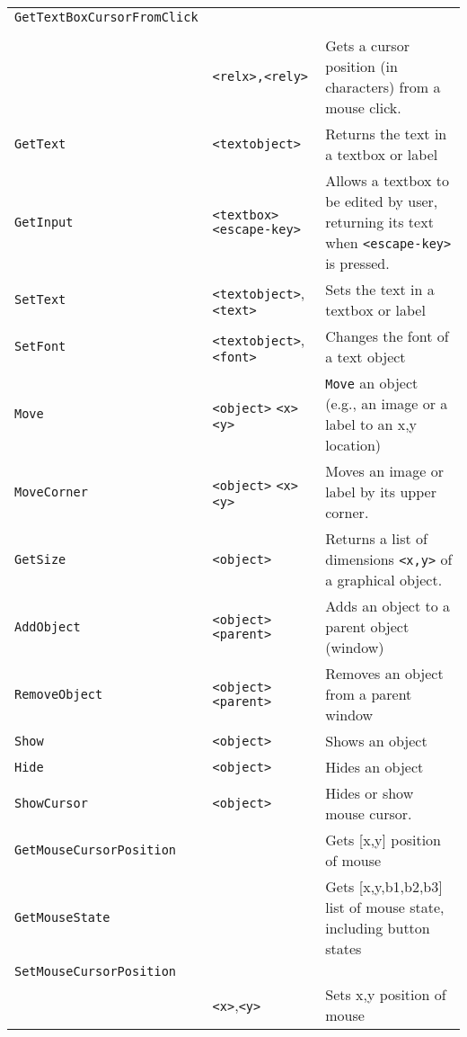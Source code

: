 \begin{longtable}{p{3cm}p{3cm}p{6cm}}
\verb+GetTextBoxCursorFromClick+&\\
\\ & \verb+<relx>,<rely>+ & Gets a cursor position (in characters) from a mouse click.\\
\verb+GetText+ &\verb+<textobject>+ &Returns the text in a textbox or label\\ 
\verb+GetInput+ &\verb+<textbox>+ \verb+<escape-key>+& Allows a textbox to be edited by user, returning its text when \verb+<escape-key>+ is pressed.\\ 
\verb+SetText+ &\verb+<textobject>+, \verb+<text>+ &Sets the text in a textbox or label\\ 
\verb+SetFont+ &\verb+<textobject>+, \verb+<font>+ &Changes the font of a text object \\ 
\verb+Move+ &\verb+<object>+ \verb+<x>+ \verb+<y>+& \verb+Move+ an object (e.g., an image or a label to an x,y location) \\ 
\verb+MoveCorner+ &\verb+<object>+ \verb+<x>+ \verb+<y>+& Moves an image or label by its upper corner.\\ 
\verb+GetSize+ &\verb+<object>+ &Returns a list of dimensions \verb+<x,y>+ of a graphical object.\\ 
\verb+AddObject+ &\verb+<object>+ \verb+<parent>+ & Adds an object to a parent object (window)\\ 
\verb+RemoveObject+ &\verb+<object>+ \verb+<parent>+ &Removes an object from a parent window\\ 
\verb+Show+ &\verb+<object>+ &Shows an object\\ 
\verb+Hide+ &\verb+<object>+ &Hides an object\\ 
\verb+ShowCursor+ &\verb+<object>+ &Hides or show mouse cursor.\\
\verb+GetMouseCursorPosition+ & &Gets [x,y] position of mouse\\
\verb+GetMouseState+&&Gets [x,y,b1,b2,b3] list of mouse state, including button states\\
\verb+SetMouseCursorPosition+ \\
&\verb+<x>+,\verb+<y>+ &Sets x,y position of mouse\\


\end{longtable}
